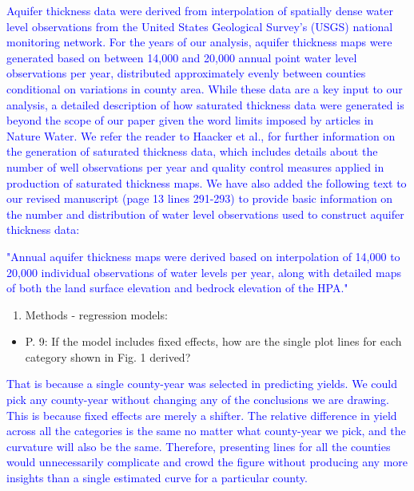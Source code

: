 \documentclass[
]{article}
\providecommand{\tightlist}{%
  \setlength{\itemsep}{0pt}\setlength{\parskip}{0pt}}
\begin{document}
\textcolor{blue}{Aquifer thickness data were derived from interpolation of spatially dense water level observations from the United States Geological Survey's (USGS) national monitoring network. For the years of our analysis, aquifer thickness maps were generated based on between 14,000 and 20,000 annual point water level observations per year, distributed approximately evenly between counties conditional on variations in county area. While these data are a key input to our analysis, a detailed description of how saturated thickness data were generated is beyond the scope of our paper given the word limits imposed by articles in Nature Water. We refer the reader to  Haacker et al., for further information on the generation of saturated thickness data, which includes details about the number of well observations per year and quality control measures applied in production of saturated thickness maps. We have also added the following text to our revised manuscript (page 13 lines 291-293) to provide basic information on the number and distribution of water level observations used to construct aquifer thickness data:}

\textcolor{blue}{"Annual aquifer thickness maps were derived based on interpolation of 14,000 to 20,000 individual observations of water levels per year, along with detailed maps of both the land surface elevation and bedrock elevation of the HPA."}

\begin{enumerate}
\def\labelenumi{\arabic{enumi}.}
\setcounter{enumi}{6}
\tightlist
\item
  Methods - regression models:
\end{enumerate}

\begin{itemize}
\tightlist
\item
  P. 9: If the model includes fixed effects, how are the single plot
  lines for each category shown in Fig. 1 derived?
\end{itemize}

\textcolor{blue}{
That is because a single county-year was selected in predicting yields. We could pick any county-year without changing any of the conclusions we are drawing. This is because fixed effects are merely a shifter. The relative difference in yield across all the categories is the same no matter what county-year we pick, and the curvature will also be the same. Therefore, presenting lines for all the counties would unnecessarily complicate and crowd the figure without producing any more insights than a single estimated curve for a particular county.
}
\end{document}
